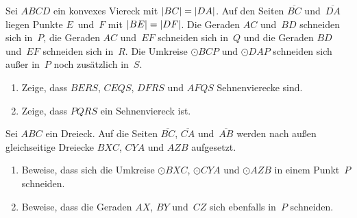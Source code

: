 \begin{aufgabe*}\label{aufgabe:IMO2005_5}
	Sei $ABCD$ ein konvexes Viereck mit $\lvert BC\rvert=\lvert DA\rvert$. Auf den Seiten $\overline{BC}$ und~$\overline{DA}$ liegen Punkte $E$~und~$F$ mit $\lvert BE\rvert=\lvert DF\rvert$. Die Geraden $AC$ und~$BD$ schneiden sich in~$P$, die Geraden $AC$ und~$EF$ schneiden sich in~$Q$ und die Geraden $BD$ und~$EF$ schneiden sich in~$R$. Die Umkreise $\odot BCP$ und $\odot DAP$ schneiden sich außer in~\(P\) noch zusätzlich in~$S$.
	\begin{enumerate}
		\item \label{teilaufgabe:IMO2005_5a}Zeige, dass $BERS$, $CEQS$, $DFRS$ und $AFQS$ Sehnenvierecke sind.
		\item \label{teilaufgabe:IMO2005_5b}Zeige, dass $PQRS$ ein Sehnenviereck ist.
	\end{enumerate}
\end{aufgabe*}

\begin{aufgabe*}\label{aufgabe:FermatPunkt}
	Sei $ABC$ ein Dreieck. Auf die Seiten $\overline{BC}$, $\overline{CA}$ und~$\overline{AB}$ werden nach außen gleichseitige Dreiecke $BXC$, $CYA$ und $AZB$ aufgesetzt.
	\begin{enumerate}
		\item \label{teilaufgabe:FermatPunkt}Beweise, dass sich die Umkreise $\odot BXC$, $\odot CYA$ und $\odot AZB$ in einem Punkt~$P$ schneiden.
		\item \label{teilaufgabe:GeradenSchneidenSichImFermatPunkt}Beweise, dass die Geraden $AX$, $BY$ und~$CZ$ sich ebenfalls in~$P$ schneiden.
	\end{enumerate}
\end{aufgabe*}

